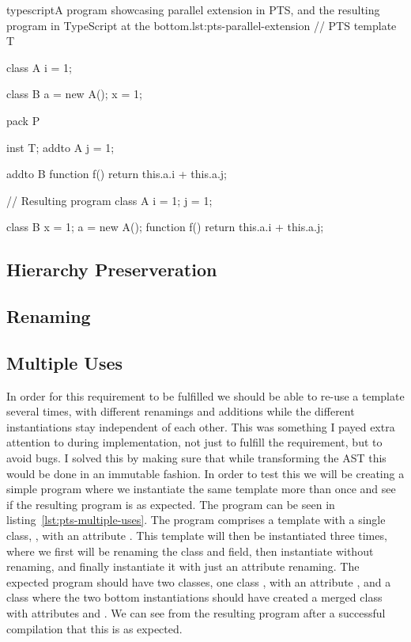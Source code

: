 \begin{code}{typescript}{A program showcasing parallel extension in PTS, and the resulting program in TypeScript at the bottom.}{lst:pts-parallel-extension}
    // PTS
    template T {
        class A {
            i = 1;
        }

        class B {
            a = new A();
            x = 1;
        }
    }

    pack P {
        inst T;
        addto A {
            j = 1;
        }

        addto B {
            function f() {
                return this.a.i + this.a.j;
            }
        }
    }

    // Resulting program
    class A {
        i = 1;
        j = 1;
    }

    class B {
        x = 1;
        a = new A();
        function f() {
            return this.a.i + this.a.j;
        }
    }
\end{code}

\subsection{Hierarchy Preserveration}

\subsection{Renaming}

\subsection{Multiple Uses}

In order for this requirement to be fulfilled we should be able to re-use a template several times, with different renamings and additions while the different instantiations stay independent of each other.
This was something I payed extra attention to during implementation, not just to fulfill the requirement, but to avoid bugs.
I solved this by making sure that while transforming the AST this would be done in an immutable fashion.
In order to test this we will be creating a simple program where we instantiate the same template more than once and see if the resulting program is as expected.
The program can be seen in listing~\vref{lst:pts-multiple-uses}.
The program comprises a template  with a single class, , with an attribute .
This template will then be instantiated three times, where we first will be renaming the class and field, then instantiate without renaming, and finally instantiate it with just an attribute renaming.
The expected program should have two classes, one class , with an attribute , and a class  where the two bottom instantiations should have created a merged class with attributes  and .
We can see from the resulting program after a successful compilation that this is as expected.

